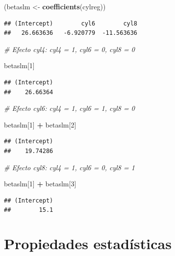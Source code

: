 \documentclass[
  12pt,
]{book}
\newenvironment{Shaded}{\begin{snugshade}}{\end{snugshade}}
\newcommand{\CommentTok}[1]{\textcolor[rgb]{0.56,0.35,0.01}{\textit{#1}}}
\newcommand{\DecValTok}[1]{\textcolor[rgb]{0.00,0.00,0.81}{#1}}
\newcommand{\KeywordTok}[1]{\textcolor[rgb]{0.13,0.29,0.53}{\textbf{#1}}}
\newcommand{\NormalTok}[1]{#1}
\newcommand{\OperatorTok}[1]{\textcolor[rgb]{0.81,0.36,0.00}{\textbf{#1}}}
\newcommand{\StringTok}[1]{\textcolor[rgb]{0.31,0.60,0.02}{#1}}
\theoremstyle{definition}
\theoremstyle{definition}
\theoremstyle{definition}
\theoremstyle{remark}
\begin{document}
\begin{Shaded}
\begin{Highlighting}[]
\NormalTok{(betaslm <-}\StringTok{ }\KeywordTok{coefficients}\NormalTok{(cylreg))}
\end{Highlighting}
\end{Shaded}

\begin{verbatim}
## (Intercept)        cyl6        cyl8 
##   26.663636   -6.920779  -11.563636
\end{verbatim}

\begin{Shaded}
\begin{Highlighting}[]
\CommentTok{# Efecto cyl4: cyl4 = 1, cyl6 = 0, cyl8 = 0}

\NormalTok{betaslm[}\DecValTok{1}\NormalTok{]}
\end{Highlighting}
\end{Shaded}

\begin{verbatim}
## (Intercept) 
##    26.66364
\end{verbatim}

\begin{Shaded}
\begin{Highlighting}[]
\CommentTok{# Efecto cyl6: cyl4 = 1, cyl6 = 1, cyl8 = 0}

\NormalTok{betaslm[}\DecValTok{1}\NormalTok{] }\OperatorTok{+}\StringTok{ }\NormalTok{betaslm[}\DecValTok{2}\NormalTok{]}
\end{Highlighting}
\end{Shaded}

\begin{verbatim}
## (Intercept) 
##    19.74286
\end{verbatim}

\begin{Shaded}
\begin{Highlighting}[]
\CommentTok{# Efecto cyl8: cyl4 = 1, cyl6 = 0, cyl8 = 1}

\NormalTok{betaslm[}\DecValTok{1}\NormalTok{] }\OperatorTok{+}\StringTok{ }\NormalTok{betaslm[}\DecValTok{3}\NormalTok{]}
\end{Highlighting}
\end{Shaded}

\begin{verbatim}
## (Intercept) 
##        15.1
\end{verbatim}

\hypertarget{propiedades-estaduxedsticas-2}{%
\section{Propiedades estadísticas}\label{propiedades-estaduxedsticas-2}}
\end{document}
